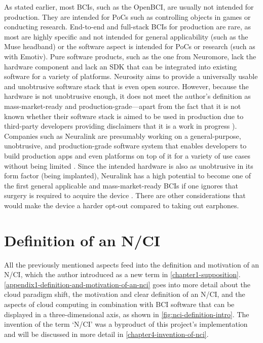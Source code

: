 As stated earlier, most BCIs, such as the OpenBCI, are usually not intended for production. They are intended for PoCs such as controlling objects in games or conducting research. End-to-end and full-stack BCIs for production are rare, as most are highly specific and not intended for general applicability (such as the Muse headband) or the software aspect is intended for PoCs or research (such as with Emotiv). Pure software products, such as the one from Neuromore, lack the hardware component and lack an SDK that can be integrated into existing software for a variety of platforms. Neurosity aims to provide a universally usable and unobtrusive software stack that is even open source. However, because the hardware is not unobtrusive enough, it does not meet the author’s definition as mass-market-ready and production-grade—apart from the fact that it is not known whether their software stack is aimed to be used in production \citep{neurosity_neurosity_2022} due to third-party developers providing disclaimers that it is a work in progress \citep{turney_notion_2022}). Companies such as Neuralink are presumably working on a general-purpose, unobtrusive, and production-grade software system that enables developers to build production apps and even platforms on top of it for a variety of use cases without being limited \citep{musk_integrated_2019}. Since the intended hardware is also as unobtrusive in its form factor (being implanted), Neuralink has a high potential to become one of the first general applicable and mass-market-ready BCIs if one ignores that surgery is required to acquire the device \citep{neuralink_approach_nodate}. There are other considerations that would make the device a harder opt-out compared to taking out earphones.

\section{Definition of an N/CI}
\label{chapter2-definition-of-an-nci}

All the previously mentioned aspects feed into the definition and motivation of an N/CI, which the author introduced as a new term in \autoref{chapter1-supposition}. \autoref{appendix1-definition-and-motivation-of-an-nci} goes into more detail about the cloud paradigm shift, the motivation and clear definition of an N/CI, and the aspects of cloud computing in combination with BCI software that can be displayed in a three-dimensional axis, as shown in \autoref{fig:nci-definition-intro}. The invention of the term ‘N/CI’ was a byproduct of this project’s implementation and will be discussed in more detail in \autoref{chapter4-invention-of-nci}.


